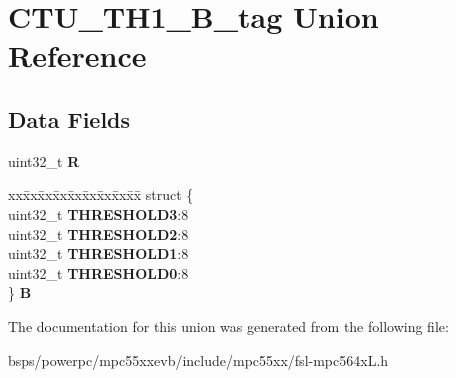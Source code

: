 \hypertarget{unionCTU__TH1__32B__tag}{}\section{C\+T\+U\+\_\+\+T\+H1\+\_\+B\+\_\+tag Union Reference}
\label{unionCTU__TH1__32B__tag}
\subsection*{Data Fields}
\begin{DoxyCompactItemize}
\item 
\mbox{\label{unionCTU__TH1__32B__tag_a79f18902b441b45780f35c68d6ec30d3}} 
uint32\+\_\+t {\bfseries R}
\item 
\mbox{\label{unionCTU__TH1__32B__tag_a7cad36ab5fe842f81621bca75c4b495c}} 
\begin{tabbing}
xx\=xx\=xx\=xx\=xx\=xx\=xx\=xx\=xx\=\kill
struct \{\\
\>uint32\_t {\bfseries THRESHOLD3}:8\\
\>uint32\_t {\bfseries THRESHOLD2}:8\\
\>uint32\_t {\bfseries THRESHOLD1}:8\\
\>uint32\_t {\bfseries THRESHOLD0}:8\\
\} {\bfseries B}\\

\end{tabbing}\end{DoxyCompactItemize}


The documentation for this union was generated from the following file\+:\begin{DoxyCompactItemize}
\item 
bsps/powerpc/mpc55xxevb/include/mpc55xx/fsl-\/mpc564x\+L.\+h\end{DoxyCompactItemize}
